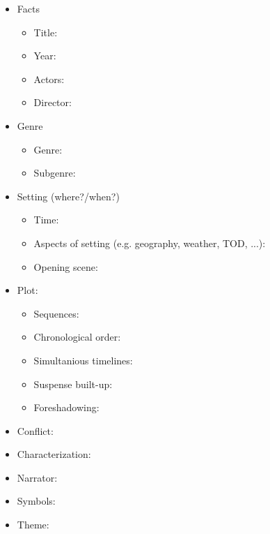 \documentclass[8pt, letterpaper]{article}
\begin{document}
\begin{itemize}
  \item Facts
  \begin{itemize}
    \item Title:
    \item Year:
    \item Actors:
    \item Director:
  \end{itemize}
  \vspace{10pt}

  \item Genre
  \begin{itemize}
    \item Genre:
    \item Subgenre:
  \end{itemize}
  \vspace{10pt}

  \item Setting (where?/when?)
  \begin{itemize}
    \item Time:
    \item Aspects of setting (e.g. geography, weather, TOD, ...):
    \vspace{20pt}
    \item Opening scene:
    \vspace{20pt}
  \end{itemize}

  \item Plot:
  \begin{itemize}
    \item Sequences:
    \vspace{60pt}
    \item Chronological order:
    \item Simultanious timelines:
    \item Suspense built-up:
    \vspace{20pt}
    \item Foreshadowing:
    \vspace{20pt}
  \end{itemize}

  \item Conflict:
  \vspace{10pt}

  \item Characterization:
  \vspace{60pt}

  \item Narrator:
  \vspace{10pt}

  \item Symbols:
  \vspace{30pt}

  \item Theme:
\end{itemize}
\end{document}
